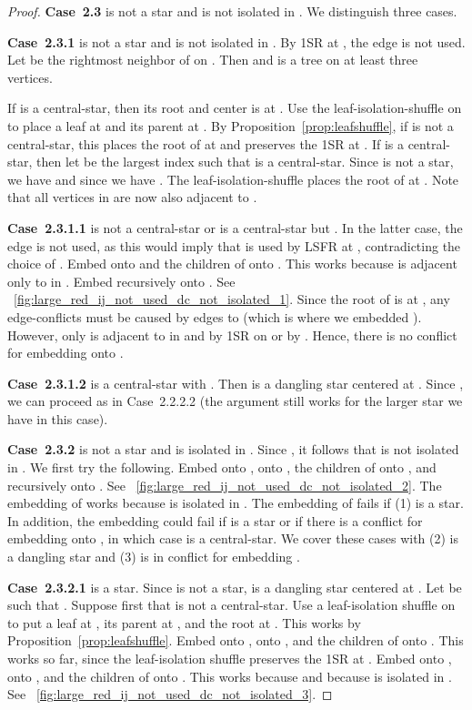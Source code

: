 \documentclass[11pt,a4paper,colorlinks=true,urlcolor=blue,citecolor=red]{article}
\theoremstyle{plain}
\newcommand{\case}[1]{\par\vspace{.5\baselineskip}\noindent\textbf{\sffamily Case~#1}}
\begin{document}
\begin{proof}
  \case{2.3}  is not a star and  is not isolated in
  . We distinguish three cases.

  \case{2.3.1}  is not a star and  is not isolated in
  . By 1SR at , the edge  is not used. Let 
  be the rightmost neighbor of  on . Then  and
   is a tree on at least three vertices.

  If  is a central-star, then its root and center is at . Use
  the leaf-isolation-shuffle on  to place a leaf at  and
  its parent at . By Proposition~\ref{prop:leafshuffle}, if 
  is not a central-star, this places the root of  at  and
  preserves the 1SR at . If  is a central-star, then let 
  be the largest index such that  is a central-star. Since
   is not a star, we have  and since  we
  have . The leaf-isolation-shuffle places the root of
   at . Note that all vertices in  are now also
  adjacent to .

  \case{2.3.1.1}  is not a central-star or  is a
  central-star but . In the latter case, the edge  is
  not used, as this would imply that  is used by LSFR at ,
  contradicting the choice of . Embed  onto  and the children
  of  onto . This works because  is adjacent only to
   in . Embed  recursively onto . See
  \figurename~\ref{fig:large_red_ij_not_used_dc_not_isolated_1}. Since
  the root of  is at , any edge-conflicts must be caused by
  edges to  (which is where we embedded ). However, only  is
  adjacent to  in  and  by 1SR on
   or by . Hence, there is no conflict for embedding 
  onto .

  \case{2.3.1.2}  is a central-star with . Then  is
  a dangling star centered at . Since , we can proceed as in
  Case~2.2.2.2 (the argument still works for the larger star we have in
  this case).

  \case{2.3.2}  is not a star and  is isolated in .
  Since , it follows that  is not isolated in
  . We first try the following. Embed  onto ,  onto
  , the children of  onto , and  recursively onto
  . See
  \figurename~\ref{fig:large_red_ij_not_used_dc_not_isolated_2}. The
  embedding of  works because  is isolated in . The
  embedding of  fails if (1)  is a star. In addition, the
  embedding could fail if  is a star or if there is a conflict
  for embedding  onto , in which case 
  is a central-star. We cover these cases with (2)  is a
  dangling star and (3)  is in conflict for embedding .

  \case{2.3.2.1}  is a star. Since  is not a star,  is a
  dangling star centered at . Let  be such that
  . Suppose first that  is not a
  central-star. Use a leaf-isolation shuffle on  to put a leaf
  at , its parent at , and the root at . This works by
  Proposition~\ref{prop:leafshuffle}. Embed  onto ,  onto ,
  and the children of  onto . This works so far, since the
  leaf-isolation shuffle preserves the 1SR at . Embed  onto ,
   onto , and the children of  onto . This works
  because  and because  is isolated in
  . See
  \figurename~\ref{fig:large_red_ij_not_used_dc_not_isolated_3}.


\end{proof}
\end{document}
